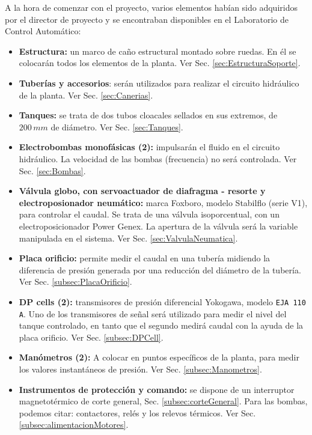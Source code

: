 A la hora de comenzar con el proyecto, varios elementos habían
sido adquiridos por el director de proyecto y se encontraban
disponibles en el Laboratorio de Control Automático:
\begin{itemize}
  \item \textbf{Estructura:} un marco de caño estructural montado sobre
  ruedas. En él se colocarán todos los elementos de la planta.
  Ver Sec. \ref{sec:EstructuraSoporte}.

  \item \textbf{Tuberías y accesorios}: serán utilizados para realizar el
  circuito hidráulico de la planta. Ver Sec. \ref{sec:Canerias}.

  \item \textbf{Tanques:} se trata de dos tubos cloacales sellados en sus
  extremos, de $200\,mm$ de diámetro. Ver Sec. \ref{sec:Tanques}.

  \item \textbf{Electrobombas monofásicas (2):} impulsarán el fluido
  en el circuito hidráulico.
  La velocidad de las bombas (frecuencia) no será controlada.
  Ver Sec. \ref{sec:Bombas}.

  \item \textbf{Válvula globo, con servoactuador de diafragma - resorte y
electroposionador neumático:} marca Foxboro, modelo
  Stabilflo (serie V1), para controlar el caudal.
  Se trata de una válvula isoporcentual, con un electroposicionador
  Power Genex.
  La apertura de la válvula será la variable manipulada en
  el sistema.
  Ver Sec. \ref{sec:ValvulaNeumatica}.

  \item \textbf{Placa orificio:} permite medir el
  caudal en una tubería midiendo la diferencia de presión generada por una 
  reducción del diámetro de la tubería. Ver Sec. \ref{subsec:PlacaOrificio}.

  \item \textbf{DP cells (2):} transmisores de presión
  diferencial Yokogawa, modelo \verb|EJA 110 A|.
  Uno de los transmisores de señal será utilizado para medir el nivel del tanque controlado,
  en tanto que el segundo medirá caudal con la ayuda de la placa orificio.
  Ver Sec. \ref{subsec:DPCell}.

  \item \textbf{Manómetros (2):} A colocar en
  puntos específicos de la planta, para medir los valores instantáneos de
  presión.
  Ver Sec. \ref{subsec:Manometros}.

  \item \textbf{Instrumentos de protección y comando:}
  se dispone de un interruptor magnetotérmico de corte general,
  Sec. \ref{subsec:corteGeneral}.
  Para las bombas, podemos citar: contactores, relés y los relevos térmicos.
  Ver Sec. \ref{subsec:alimentacionMotores}.


\end{itemize}
